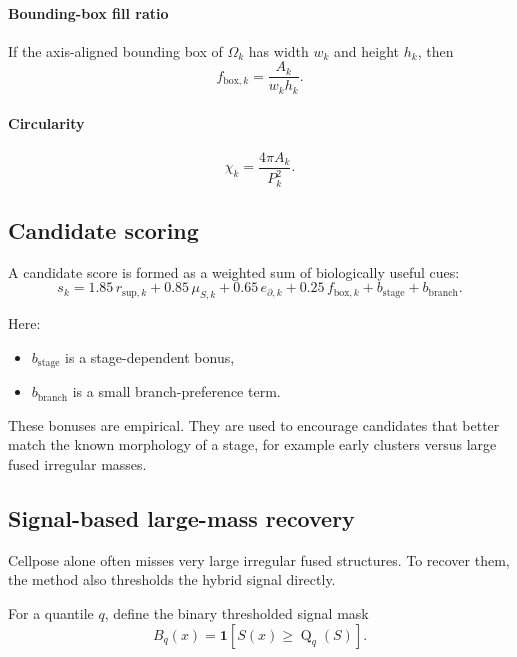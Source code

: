 \documentclass[11pt]{article}
\newcommand{\1}{\mathbf{1}}
\newcommand{\quantile}{\operatorname{Q}}
\newcommand{\signal}{S}
\begin{document}
\paragraph{Bounding-box fill ratio}
If the axis-aligned bounding box of $\Omega_k$ has width $w_k$ and height $h_k$, then
\begin{equation}
f_{\mathrm{box},k} = \frac{A_k}{w_k h_k}.
\end{equation}

\paragraph{Circularity}
\begin{equation}
\chi_k = \frac{4\pi A_k}{P_k^2}.
\end{equation}

\subsection{Candidate scoring}
A candidate score is formed as a weighted sum of biologically useful cues:
\begin{equation}
s_k = 1.85\,r_{\mathrm{sup},k} + 0.85\,\mu_{\signal,k} + 0.65\,e_{\partial,k} + 0.25\,f_{\mathrm{box},k} + b_{\mathrm{stage}} + b_{\mathrm{branch}}.
\end{equation}

Here:
\begin{itemize}[leftmargin=1.5em]
  \item $b_{\mathrm{stage}}$ is a stage-dependent bonus,
  \item $b_{\mathrm{branch}}$ is a small branch-preference term.
\end{itemize}

These bonuses are empirical. They are used to encourage candidates that better match the known morphology of a stage, for example early clusters versus large fused irregular masses.

\subsection{Signal-based large-mass recovery}
Cellpose alone often misses very large irregular fused structures. To recover them, the method also thresholds the hybrid signal directly.

For a quantile $q$, define the binary thresholded signal mask
\begin{equation}
B_q(x) = \1[\signal(x) \ge \quantile_q(\signal)].
\end{equation}
\end{document}
